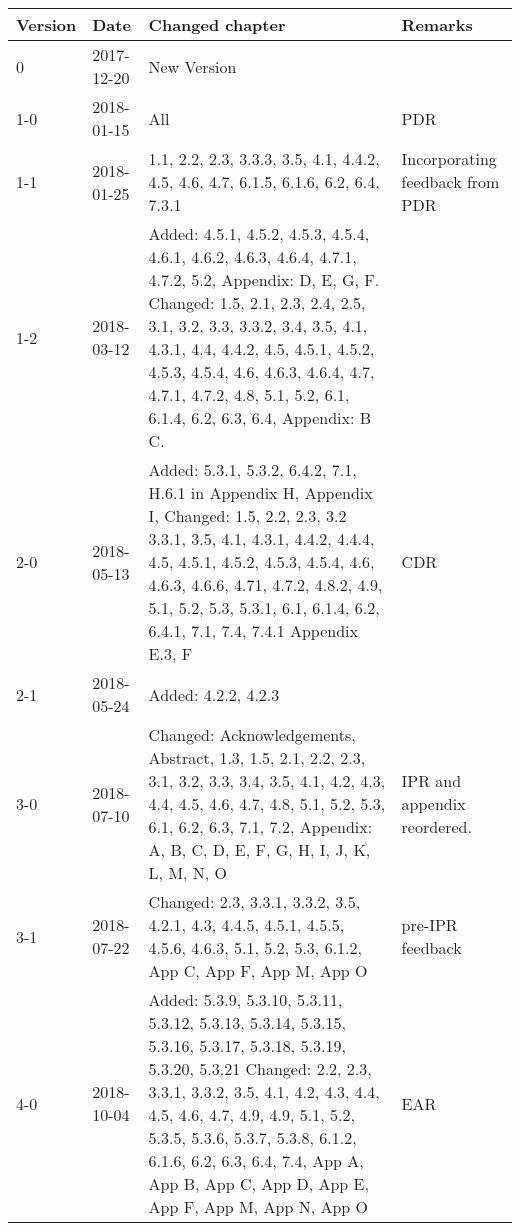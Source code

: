 \begin{longtable}{|p{1.5cm}|p{2cm}|p{6cm}|p{3cm}|}\hline
\centering
\textbf{Version} & \textbf{Date}       & \textbf{Changed chapter}   & \textbf{Remarks}  \\\hline
0       & 2017-12-20 & New Version   &          \\
1-0     & 2018-01-15 & All          & PDR                             \\
1-1     & 2018-01-25 & 1.1, 2.2, 2.3, 3.3.3, 3.5, 4.1, 4.4.2, 4.5, 4.6, 4.7, 6.1.5, 6.1.6, 6.2, 6.4, 7.3.1                                                                                                                                                                                        & Incorporating feedback from PDR \\
1-2     & 2018-03-12 &  Added: 4.5.1, 4.5.2, 4.5.3, 4.5.4, 4.6.1, 4.6.2, 4.6.3, 4.6.4, 4.7.1, 4.7.2, 5.2, Appendix: D, E, G, F.  Changed: 1.5, 2.1, 2.3, 2.4, 2.5, 3.1, 3.2, 3.3, 3.3.2, 3.4, 3.5, 4.1, 4.3.1, 4.4, 4.4.2, 4.5, 4.5.1, 4.5.2, 4.5.3, 4.5.4, 4.6, 4.6.3, 4.6.4, 4.7, 4.7.1, 4.7.2, 4.8, 5.1, 5.2, 6.1, 6.1.4, 6.2, 6.3, 6.4, Appendix: B C.                                                     &                                 \\
2-0     & 2018-05-13 & Added: 5.3.1, 5.3.2, 6.4.2, 7.1, H.6.1 in Appendix H, Appendix I, Changed: 1.5, 2.2, 2.3, 3.2 3.3.1, 3.5, 4.1, 4.3.1, 4.4.2, 4.4.4, 4.5, 4.5.1, 4.5.2, 4.5.3, 4.5.4, 4.6, 4.6.3, 4.6.6, 4.71, 4.7.2, 4.8.2, 4.9, 5.1, 5.2, 5.3, 5.3.1, 6.1, 6.1.4, 6.2, 6.4.1, 7.1, 7.4, 7.4.1 Appendix E.3, F & CDR   \\
2-1     & 2018-05-24 & Added: 4.2.2, 4.2.3 & \\
3-0     & 2018-07-10  & Changed: Acknowledgements, Abstract, 1.3, 1.5, 2.1, 2.2, 2.3, 3.1, 3.2, 3.3, 3.4, 3.5, 4.1, 4.2, 4.3, 4.4, 4.5, 4.6, 4.7, 4.8, 5.1, 5.2, 5.3, 6.1, 6.2, 6.3, 7.1, 7.2, Appendix: A, B, C, D, E, F, G, H, I, J, K, L, M, N, O & IPR and appendix reordered. \\ 
3-1     & 2018-07-22  & Changed: 2.3, 3.3.1, 3.3.2, 3.5, 4.2.1, 4.3, 4.4.5, 4.5.1, 4.5.5, 4.5.6, 4.6.3, 5.1, 5.2, 5.3, 6.1.2, App C, App F, App M, App O   & pre-IPR feedback\\ \hline 
4-0 & 2018-10-04 & Added: 5.3.9, 5.3.10, 5.3.11, 5.3.12, 5.3.13, 5.3.14, 5.3.15, 5.3.16, 5.3.17, 5.3.18, 5.3.19, 5.3.20, 5.3.21 Changed: 2.2, 2.3, 3.3.1, 3.3.2, 3.5, 4.1, 4.2, 4.3, 4.4, 4.5, 4.6, 4.7, 4.9, 4.9, 5.1, 5.2, 5.3.5, 5.3.6, 5.3.7, 5.3.8, 6.1.2, 6.1.6, 6.2, 6.3, 6.4, 7.4, App A, App B, App C, App D, App E, App F, App M, App N, App O  & EAR \\ \hline

\end{longtable}
